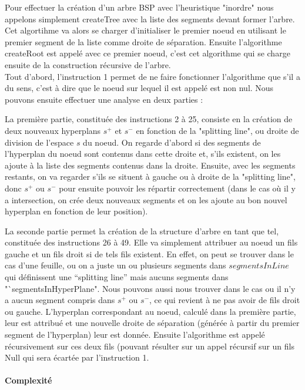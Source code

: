 \documentclass[11pt,a4paper]{article}
\theoremstyle{definition}
\theoremstyle{remark}
\begin{document}
Pour effectuer la création d'un arbre BSP avec l'heuristique "inordre" nous appelons simplement createTree avec la liste des segments devant former l'arbre. Cet algortihme va alors se charger d'initialiser le premier noeud en utilisant le premier segment de la liste comme droite de séparation. Ensuite l'algorithme createRoot est appelé avec ce premier noeud, c'est cet algorithme qui se charge ensuite de la construction récursive de l'arbre. \\

Tout d'abord, l'instruction 1 permet de ne faire fonctionner l'algorithme que s'il a du sens, c'est à dire que le noeud sur lequel il est appelé est non nul. Nous pouvons ensuite effectuer une analyse en deux parties : 

La première partie, constituée des instructions 2 à 25, consiste en la création de deux nouveaux hyperplans $s^+$ et $s^-$ en fonction de la "splitting line", ou droite de division de l'espace $s$ du noeud. On regarde d'abord si des segments de l'hyperplan du noeud sont contenus dans cette droite et, s'ils existent, on les ajoute à la liste des segments contenus dans la droite. Ensuite, avec les segments restants, on va regarder s'ils se situent à gauche ou à droite de la "splitting line", donc $s^+$ ou $s^-$ pour ensuite pouvoir les répartir correctement (dans le cas où il y a intersection, on crée deux nouveaux segments et on les ajoute au bon nouvel hyperplan en fonction de leur position). 

La seconde partie permet la création de la structure d'arbre en tant que tel, constituée des instructions 26 à 49. Elle va simplement attribuer au noeud un fils gauche et un fils droit si de tels fils existent. En effet, on peut se trouver dans le cas d'une feuille, ou on a juste un ou plusieurs segments dans $segmentsInLine$ qui définissent une "`splitting line"' mais aucuns segments dans "`segmentsInHyperPlane". Nous pouvons aussi nous trouver dans le cas ou il n'y a aucun segment compris dans $s^+$ ou $s^-$, ce qui revient à ne pas avoir de fils droit ou gauche. L'hyperplan correspondant au noeud, calculé dans la première partie, leur est attribué et une nouvelle droite de séparation (générée à partir du premier segment de l'hyperplan) leur est donnée. Ensuite l'algorithme est appelé récursivement sur ces deux fils (pouvant résulter sur un appel récursif sur un fils Null qui sera écartée par l'instruction 1. 

\paragraph{Complexité}
\end{document}
